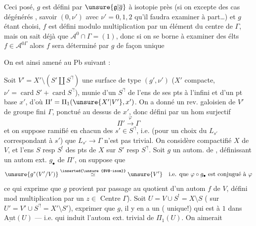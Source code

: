 
Ceci posé,  $g$ est défini par $\unsure{\mathfrak g|\overline g}$ à isotopie près  (si on excepte des cas  dégénérés , savoir $(0,\nu')$ avec $\nu'=0,1,2$ qu'il faudra examiner à part\ldots) et $g$ étant choisi, $f$ est défini modulo multiplication par un élément du centre de $\Gamma$, mais on sait déjà que $\mathcal A^0\cap\Gamma=(1)$, donc si on se borne à examiner des élts $f\in\mathcal A^{0\Gamma}$ alors $f$ sera déterminé par $g$ de façon unique

On est ainsi amené au Pb suivant :

Soit $V'=X'\setminus(S'\amalg S^{\prime!})$ une surface
  de type $(g',\nu')$
($X'$ compacte, $\nu'=\operatorname{card} S'+\operatorname{card} S^{\prime!}$),
munie d'un  $S^{\prime!}$ de l'ens de ses pts à l'infini
et d'un pt base $x'$, d'où $\Pi'=\Pi_1(\unsure{X'|V'},x')$.
On a donné un rev. galoisien  de $V'$ de groupe
fini $\Gamma$, ponctué au dessus de $x'$, donc défini par un hom surjectif
\[
\Pi'\xrightarrow{\varphi}\Gamma
\]
et on suppose  ramifié en chacun des $s'\in S^{\prime!}$,
i.e. (pour un choix du   $L_{s'}$
correspondant à $s'$) que $L_{s'}\to\Gamma$ n'est pas trivial.
On considère  compactifié  $X$ de $V$,
et l'ens $S$ resp $S^!$ des pts de $X$ sur $S'$ resp $S^{\prime!}$.
Soit $g$ un autom. de , définissant un autom ext.
$g_\bullet$ de $\Pi'$, on suppose que
\[
\unsure{g^*(V'/V)}\overset{\text{\inserted{\unsure{$V$-isom}}}}{\simeq}\unsure{V'}
\quad\text{i.e. que }\varphi\circ g_\bullet\text{ est conjugué à }\varphi
\]
\unsure{(|\{}ce qui exprime que $g$ provient par passage au quotient d'un autom $f$ de $V$,
défini mod multiplication par un 
$z\in$ Centre $\Gamma$).
Soit $U=V\cup S^!=X\setminus S$ ( sur
$U'=V'\cup S^{\prime!}=X'\setminus S'$),
  exprimer que
 
$g$, il y en a un ( unique!) qui est 
 à $1$ dans $\underline{\mathrm{Aut}}(U)$ --- i.e. qui induit
l'autom ext. trivial de $\Pi_1(U)$. On aimerait

